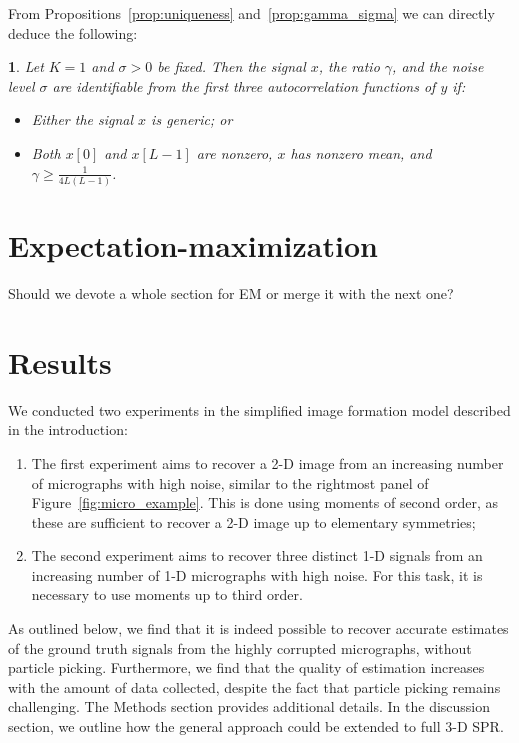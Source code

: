 \documentclass[english,11pt]{article}
\newcommand{\1}{\mathbf{1}}
\numberwithin{equation}{section}
\theoremstyle{plain}
\theoremstyle{definition}
\theoremstyle{remark}
\theoremstyle{plain}
\theoremstyle{remark}
\theoremstyle{plain}
\newtheorem{corollary}[thm]{\protect\corollaryname}
\theoremstyle{plain}
\providecommand{\corollaryname}{Corollary}
\begin{document}
From Propositions~\ref{prop:uniqueness} and~\ref{prop:gamma_sigma} we can directly deduce the following:
\begin{corollary}
	Let $K=1$ and $\sigma > 0$ be fixed. Then the signal $x$, the ratio $\gamma$, and the noise level $\sigma$ are identifiable from the first three autocorrelation functions of $y$ if:
	\begin{itemize}
		\item Either the signal $x$ is generic; or
		\item  Both $x[0]$  and $x[L-1]$ are nonzero, $x$ has nonzero mean, and $\gamma\geq\frac{1}{4L(L-1)}$.
	\end{itemize}
\end{corollary}


\section{Expectation-maximization}

Should we devote a whole section for EM or merge it with the next one?


\section{Results} \label{sec:results}

We conducted two experiments in the simplified image formation model described in the introduction:
\begin{enumerate}
	\item The first experiment aims to recover a 2-D image from an increasing number of micrographs with high noise, similar to the rightmost panel of Figure~\ref{fig:micro_example}. This is done using moments of second order, as these are sufficient to recover a 2-D image up to elementary symmetries;
	\item The second experiment aims to recover three distinct 1-D signals from an increasing number of 1-D micrographs with high noise. For this task, it is necessary to use moments up to third order.
\end{enumerate}
As outlined below, we find that it is indeed possible to recover accurate estimates of the ground truth signals from the highly corrupted micrographs, without particle picking. Furthermore, we find that the quality of estimation increases with the amount of data collected, despite the fact that particle picking remains challenging. The Methods section provides additional details. In the discussion section, we outline how the general approach could be extended to full 3-D SPR.
\end{document}
